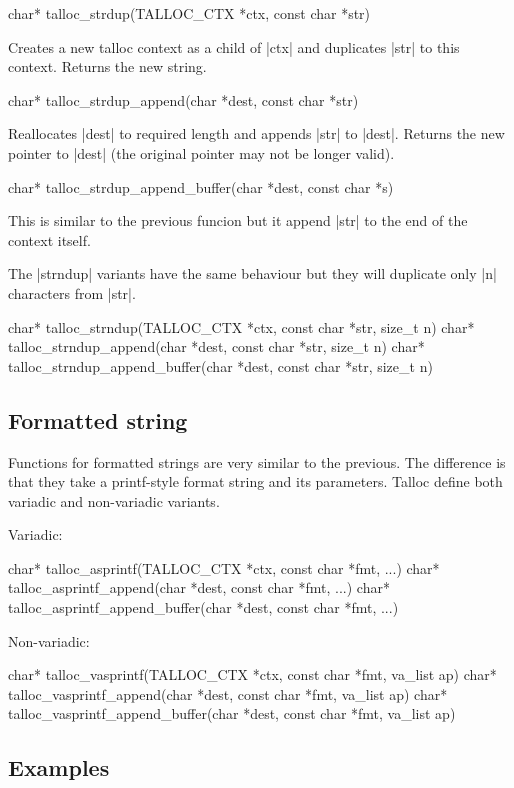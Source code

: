 \begin{funcproto}
char* talloc_strdup(TALLOC_CTX *ctx, const char *str)
\end{funcproto}
\begin{funcdesc}
  Creates a new talloc context as a child of |ctx| and duplicates |str| to
  this context. Returns the new string.
\end{funcdesc}
\begin{funcproto}
char* talloc_strdup_append(char *dest, const char *str)
\end{funcproto}
\begin{funcdesc}
  Reallocates |dest| to required length and appends |str| to |dest|. Returns the
  new pointer to |dest| (the original pointer may not be longer valid).
\end{funcdesc}
\begin{funcproto}
char* talloc_strdup_append_buffer(char *dest, const char *s)
\end{funcproto}
\begin{funcdesc}
  This is similar to the previous funcion but it append |str| to the end of the
  context itself.
\end{funcdesc}
\funclistend
The |strndup| variants have the same behaviour but they will duplicate only |n|
characters from |str|.

\begin{funcproto}
char* talloc_strndup(TALLOC_CTX *ctx, const char *str,
                     size_t n)
char* talloc_strndup_append(char *dest, const char *str,
                            size_t n)
char* talloc_strndup_append_buffer(char *dest, const char
                                   *str, size_t n)
\end{funcproto}

\subsection{Formatted string}

Functions for formatted strings are very similar to the previous. The difference
is that they take a printf-style format string and its parameters. Talloc define
both variadic and non-variadic variants.

Variadic:
\begin{funcproto}
char* talloc_asprintf(TALLOC_CTX *ctx, const char *fmt, ...)
char* talloc_asprintf_append(char *dest, const char *fmt,
                             ...)
char* talloc_asprintf_append_buffer(char *dest, const char
                                    *fmt, ...)
\end{funcproto}

Non-variadic:
\begin{funcproto}
char* talloc_vasprintf(TALLOC_CTX *ctx, const char *fmt,
                       va_list ap)
char* talloc_vasprintf_append(char *dest, const char *fmt,
                              va_list ap)
char* talloc_vasprintf_append_buffer(char *dest, const char
                                     *fmt, va_list ap)
\end{funcproto}

\subsection{Examples}